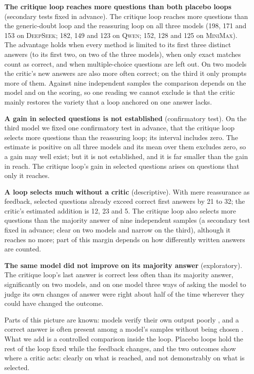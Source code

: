 \documentclass[11pt]{article}
\newcommand{\ds}{\textsc{DeepSeek}}
\newcommand{\qw}{\textsc{Qwen}}
\newcommand{\mm}{\textsc{MiniMax}}
\begin{document}
\textbf{The critique loop reaches more questions than both placebo loops} (secondary tests fixed in advance).
The critique loop reaches more questions than the generic-doubt loop and the reassuring loop on all three models (198, 171 and 153 on \ds; 182, 149 and 123 on \qw; 152, 128 and 125 on \mm).
The advantage holds when every method is limited to its first three distinct answers (to its first two, on two of the three models), when only exact matches count as correct, and when multiple-choice questions are left out.
On two models the critic's new answers are also more often correct; on the third it only prompts more of them.
Against nine independent samples the comparison depends on the model and on the scoring, so one reading we cannot exclude is that the critic mainly restores the variety that a loop anchored on one answer lacks.

\textbf{A gain in selected questions is not established} (confirmatory test).
On the third model we fixed one confirmatory test in advance, that the critique loop selects more questions than the reassuring loop; its interval includes zero.
The estimate is positive on all three models and its mean over them excludes zero, so a gain may well exist; but it is not established, and it is far smaller than the gain in reach.
The critique loop's gain in selected questions arises on questions that only it reaches.

\textbf{A loop selects much without a critic} (descriptive).
With mere reassurance as feedback, selected questions already exceed correct first answers by 21 to 32; the critic's estimated addition is 12, 23 and 5.
The critique loop also selects more questions than the majority answer of nine independent samples (a secondary test fixed in advance; clear on two models and narrow on the third), although it reaches no more; part of this margin depends on how differently written answers are counted.

\textbf{The same model did not improve on its majority answer} (exploratory).
The critique loop's last answer is correct less often than its majority answer, significantly on two models, and on one model three ways of asking the model to judge its own changes of answer were right about half of the time wherever they could have changed the outcome.

Parts of this picture are known: models verify their own output poorly \citep{huang2024cannot,stechly2024selfverification,song2024mindgap}, and a correct answer is often present among a model's samples without being chosen \citep{brown2024monkeys,jain2026cliff}.
What we add is a controlled comparison inside the loop.
Placebo loops hold the rest of the loop fixed while the feedback changes, and the two outcomes show where a critic acts: clearly on what is reached, and not demonstrably on what is selected.
\end{document}
